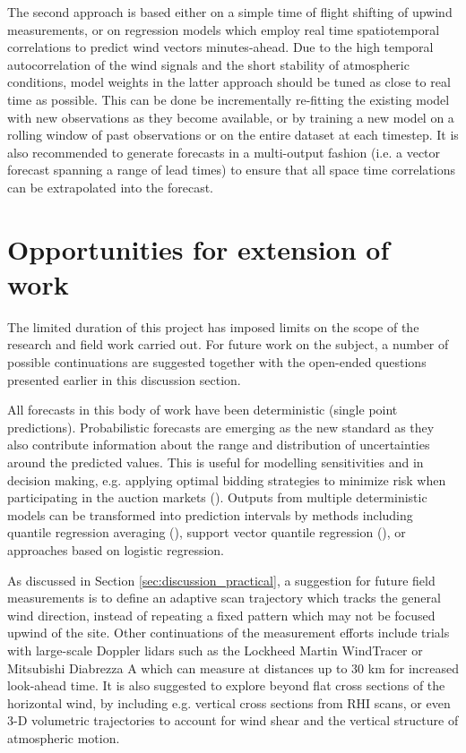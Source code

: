 The second approach is based either on a simple time of flight shifting of upwind measurements, or on regression models which employ real time spatiotemporal correlations to predict wind vectors minutes-ahead. Due to the high temporal autocorrelation of the wind signals and the short stability of atmospheric conditions, model weights in the latter approach should be tuned as close to real time as possible. This can be done be incrementally re-fitting the existing model with new observations as they become available, or by training a new model on a rolling window of past observations or on the entire dataset at each timestep. It is also recommended to generate forecasts in a multi-output fashion (i.e. a vector forecast spanning a range of lead times) to ensure that all space time correlations can be extrapolated into the forecast.

\clearpage
\section{Opportunities for extension of work}
\label{sec:discussion_extension}

The limited duration of this project has imposed limits on the scope of the research and field work carried out. For future work on the subject, a number of possible continuations are suggested together with the open-ended questions presented earlier in this discussion section.

All forecasts in this body of work have been deterministic (single point predictions). Probabilistic forecasts are emerging as the new standard as they also contribute information about the range and distribution of uncertainties around the predicted values. This is useful for modelling sensitivities and in decision making, e.g. applying optimal bidding strategies to minimize risk when participating in the auction markets (\cite{pinson_trading_2007}). Outputs from multiple deterministic models can be transformed into prediction intervals by methods including quantile regression averaging (\cite{nowotarski_computing_2015}), support vector quantile regression (\cite{he_short-term_2017}), or approaches based on logistic regression.

As discussed in Section \ref{sec:discussion_practical}, a suggestion for future field measurements is to define an adaptive scan trajectory which tracks the general wind direction, instead of repeating a fixed pattern which may not be focused upwind of the site. Other continuations of the measurement efforts include trials with large-scale Doppler lidars such as the Lockheed Martin WindTracer or Mitsubishi Diabrezza A which can measure at distances up to 30 km for increased look-ahead time. It is also suggested to explore beyond flat cross sections of the horizontal wind, by including e.g. vertical cross sections from RHI scans, or even 3-D volumetric trajectories to account for wind shear and the vertical structure of atmospheric motion.

